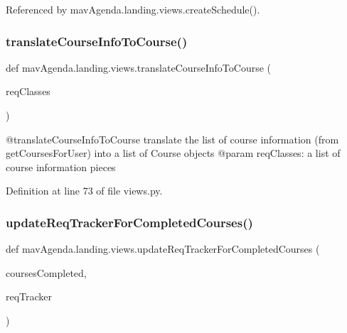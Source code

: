 Referenced by mav\+Agenda.\+landing.\+views.\+create\+Schedule().

\mbox{\label{namespacemavAgenda_1_1landing_1_1views_ac3facecfedd11b12fba64630c173fb1b}} 
\subsubsection{\texorpdfstring{translate\+Course\+Info\+To\+Course()}{translateCourseInfoToCourse()}}
{\footnotesize\ttfamily def mav\+Agenda.\+landing.\+views.\+translate\+Course\+Info\+To\+Course (\begin{DoxyParamCaption}\item[{}]{req\+Classes }\end{DoxyParamCaption})}

\begin{DoxyVerb}@translateCourseInfoToCourse translate the list of course information (from getCoursesForUser) into a list of Course objects
@param reqClasses: a list of course information pieces
\end{DoxyVerb}
 

Definition at line 73 of file views.\+py.

\mbox{\label{namespacemavAgenda_1_1landing_1_1views_a71b49cd4a5899b4c459df2b7761cc1f2}} 
\subsubsection{\texorpdfstring{update\+Req\+Tracker\+For\+Completed\+Courses()}{updateReqTrackerForCompletedCourses()}}
{\footnotesize\ttfamily def mav\+Agenda.\+landing.\+views.\+update\+Req\+Tracker\+For\+Completed\+Courses (\begin{DoxyParamCaption}\item[{}]{courses\+Completed,  }\item[{}]{req\+Tracker }\end{DoxyParamCaption})}

